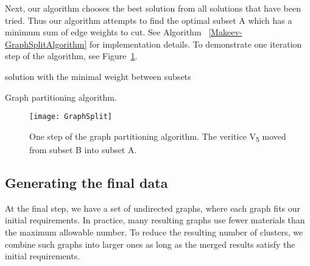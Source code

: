 Next, our algorithm chooses the best solution from all solutions that have been tried.
Thus our algorithm attempts to find the optimal subset A which has a minimum sum of edge weights to cut.
See Algorithm ~\ref{Makeev-GraphSplitAlgorithm} for implementation details.
To demonstrate one iteration step of the algorithm, see Figure~\ref{Makeev-GraphPartitioning}.

\LinesNumbered
\DontPrintSemicolon
\begin{algorithm}\label{Makeev-GraphSplitAlgorithm}
\Return solution with the minimal weight between subsets\;
\caption{Graph partitioning algorithm.}
\end{algorithm}


\begin{figure}\centering
\texttt{[image: GraphSplit]}
\caption{
One step of the graph partitioning algorithm.
The veritice V\textsubscript{5} moved from subset B into subset A.
} \label{Makeev-GraphPartitioning}
\end{figure}

\subsection{Generating the final data}

At the final step, we have a set of undirected graphs, where each graph fits our initial requirements.
In practice, many resulting graphs use fewer materials than the maximum allowable number.
To reduce the resulting number of clusters, we combine such graphs into larger ones as long as the merged results satisfy the initial requirements.


